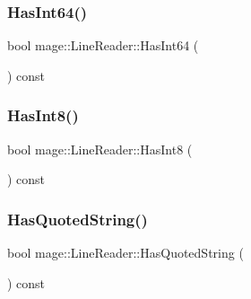 \hypertarget{classmage_1_1_line_reader_a3a7883e24fb3108a79ecda4eaac983f2}{}\label{classmage_1_1_line_reader_a3a7883e24fb3108a79ecda4eaac983f2} 
\subsubsection{\texorpdfstring{Has\+Int64()}{HasInt64()}}
{\footnotesize\ttfamily bool mage\+::\+Line\+Reader\+::\+Has\+Int64 (\begin{DoxyParamCaption}{ }\end{DoxyParamCaption}) const\hspace{0.3cm}{\ttfamily [protected]}}

\hypertarget{classmage_1_1_line_reader_a1eecd5324b2e212826c49e600cc46e1f}{}\label{classmage_1_1_line_reader_a1eecd5324b2e212826c49e600cc46e1f} 
\subsubsection{\texorpdfstring{Has\+Int8()}{HasInt8()}}
{\footnotesize\ttfamily bool mage\+::\+Line\+Reader\+::\+Has\+Int8 (\begin{DoxyParamCaption}{ }\end{DoxyParamCaption}) const\hspace{0.3cm}{\ttfamily [protected]}}

\hypertarget{classmage_1_1_line_reader_ac92de9a3d986c7031c902c9489cfaa5a}{}\label{classmage_1_1_line_reader_ac92de9a3d986c7031c902c9489cfaa5a} 
\subsubsection{\texorpdfstring{Has\+Quoted\+String()}{HasQuotedString()}}
{\footnotesize\ttfamily bool mage\+::\+Line\+Reader\+::\+Has\+Quoted\+String (\begin{DoxyParamCaption}{ }\end{DoxyParamCaption}) const\hspace{0.3cm}{\ttfamily [protected]}}

\hypertarget{classmage_1_1_line_reader_a011b5a0d1bd2d157033e3bf7d7323aed}{}\label{classmage_1_1_line_reader_a011b5a0d1bd2d157033e3bf7d7323aed} 
